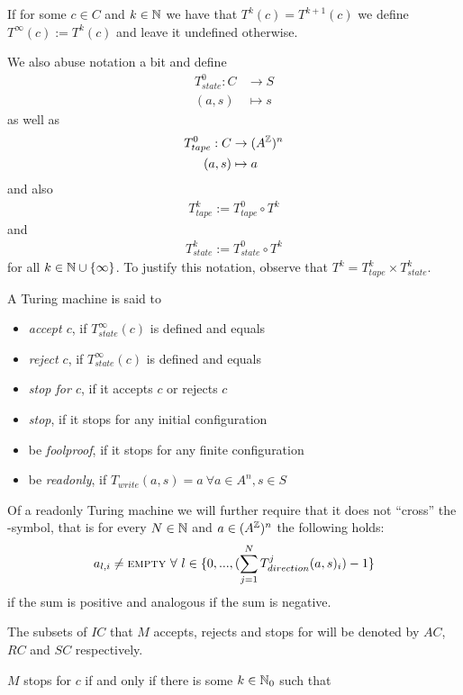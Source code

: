 If for some $c \in C$ and $k \in \mathbb{N}$ we have that $T^k(c) = T^{k+1}(c)$ we define $T^\infty(c) := T^k(c)$ and leave it undefined otherwise.

We also abuse notation a bit and define
\begin{align*}
	T_{state}^0: C &\to S \\
	(a,s) &\mapsto s
\end{align*}
as well as
\begin{align*}
	T_{tape}^0: C &\to (A^{\mathbb{Z}})^n \\
	(a,s) &\mapsto a
\end{align*}
and also
\begin{align*}
	T_{tape}^k := T_{tape}^0 \circ T^k
\end{align*}
and
\begin{align*}
	T_{state}^k := T_{state}^0 \circ T^k
\end{align*}
for all $k \in \mathbb{N} \cup \{\infty\}$.
To justify this notation, observe that $T^k = T_{tape}^k \times T_{state}^k$.

A Turing machine is said to
\begin{itemize}
	\item{\emph{accept $c$}, if $T_{state}^\infty(c)$ is defined and equals \ACC}
	\item{\emph{reject $c$}, if $T_{state}^\infty(c)$ is defined and equals \REJ}
	\item{\emph{stop for $c$}, if it accepts $c$ or rejects $c$}
	\item{\emph{stop}, if it stops for any initial configuration}
	\item{be \emph{foolproof}, if it stops for any finite configuration}
	\item{be \emph{readonly}, if $T_{write}(a,s) = a~\forall a \in A^n, s \in S$}
\end{itemize}
Of a readonly Turing machine we will further require that it does not ``cross'' the \EMP-symbol, that is for every $N \in \mathbb{N}$ and $a \in (A^{\mathbb{Z}})^n$ the following holds:
\begin{align*}
	a_{l,i} \neq \text{\scshape{empty}}~\forall~l \in \{0,...,(\sum_{j=1}^N T_{direction}^j(a,s)_i) -1\}
\end{align*}
if the sum is positive and analogous if the sum is negative.

The subsets of $IC$ that $M$ accepts, rejects and stops for will be denoted by $AC$, $RC$ and $SC$ respectively.

\remark $M$ stops for $c$ if and only if there is some $k \in \mathbb{N}_0$ such that 

